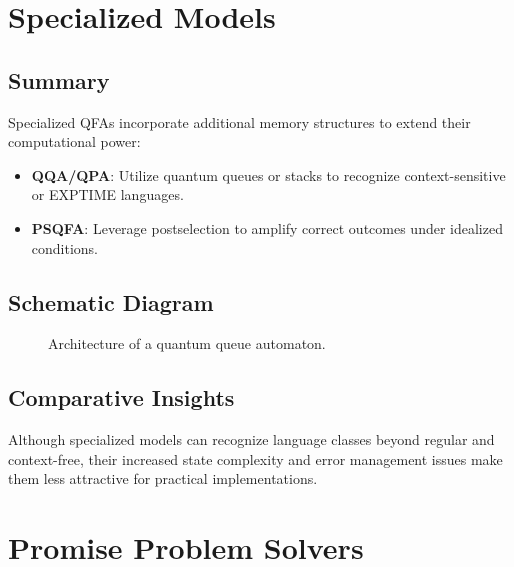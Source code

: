 \section{Specialized Models}

\subsection{Summary}
Specialized QFAs incorporate additional memory structures to extend their computational power:
\begin{itemize}
    \item \textbf{QQA/QPA}: Utilize quantum queues or stacks to recognize context-sensitive or EXPTIME languages.
    \item \textbf{PSQFA}: Leverage postselection to amplify correct outcomes under idealized conditions.
\end{itemize}

\subsection{Schematic Diagram}
\begin{figure}[ht]
\centering
{}
\caption{Architecture of a quantum queue automaton.}
\label{fig:qqa}
\end{figure}

\subsection{Comparative Insights}
Although specialized models can recognize language classes beyond regular and context-free, their increased state complexity and error management issues make them less attractive for practical implementations.

\section{Promise Problem Solvers}

